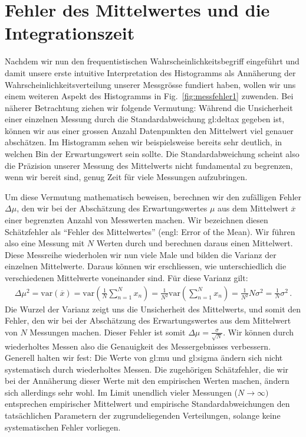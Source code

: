 \section{Fehler des Mittelwertes und die Integrationszeit}

Nachdem wir nun den frequentistischen Wahrscheinlichkeitsbegriff eingeführt und damit unsere erste intuitive Interpretation des Histogramms als Annäherung der Wahrscheinlichkeitsverteilung unserer Messgrösse fundiert haben, wollen wir uns einem weiteren Aspekt des Histogramms in   Fig.~\ref{fig:messfehler1} zuwenden. Bei näherer Betrachtung ziehen wir folgende Vermutung: Während die Unsicherheit einer einzelnen Messung durch die Standardabweichung \gls{gl:deltax} gegeben ist, können wir aus einer grossen Anzahl Datenpunkten den Mittelwert viel genauer abschätzen. Im Histogramm sehen wir beispielsweise bereits sehr deutlich, in welchen Bin der Erwartungswert sein sollte. Die Standardabweichung scheint also die Präzision unserer Messung des Mittelwerts nicht fundamental zu begrenzen, wenn wir bereit sind, genug Zeit für viele Messungen aufzubringen.


Um diese Vermutung mathematisch beweisen, berechnen wir den zufälligen Fehler $\Delta{\mu}$, den wir bei der Abschätzung des Erwartungswertes $\mu$ aus dem Mittelwert $\overline{x}$ einer begrenzten Anzahl von Messwerten machen. Wir bezeichnen diesen Schätzfehler als ``Fehler des Mittelwertes'' (engl: Error of the Mean). Wir führen also eine Messung mit $N$ Werten durch und berechnen daraus einen Mittelwert. Diese Messreihe wiederholen wir nun viele Male und bilden die Varianz der einzelnen Mittelwerte. Daraus können wir erschliessen, wie unterschiedlich die verschiedenen Mittelwerte voneinander sind. Für diese Varianz gilt:
\begin{align}
\Delta{\mu}^2 = \text{var} \left( \overline{x} \right) = \text{var} \left( \frac{1}{N} \sum^N_{n=1} x_n \right) = \frac{1}{N^2} \text{var} \left( \sum^N_{n=1} x_n \right) = \frac{1}{N^2} N \sigma^2 = \frac{1}{N} \sigma^2\,.
\label{eq:vl3-1}
\end{align}
Die Wurzel der Varianz zeigt uns die Unsicherheit des Mittelwerts, und somit den Fehler, den wir bei der Abschätzung des Erwartungswertes aus dem Mittelwert von $N$ Messungen machen.  Dieser Fehler ist somit $\Delta \mu = \frac{ \sigma }{ \sqrt{N} }$. Wir können durch wiederholtes Messen also die Genauigkeit des Messergebnisses verbessern. Generell halten wir fest: Die Werte von \gls{gl:mu} und  \gls{gl:sigma} ändern sich nicht systematisch durch wiederholtes Messen. Die zugehörigen Schätzfehler, die wir bei der Annäherung dieser Werte mit den empirischen Werten machen, ändern sich allerdings sehr wohl. Im Limit unendlich vieler Messungen ($N  \rightarrow  \infty)$ entsprechen empirischer Mittelwert und empirische Standardabweichungen den tatsächlichen Parametern der zugrundeliegenden Verteilungen, solange keine systematischen Fehler vorliegen.

